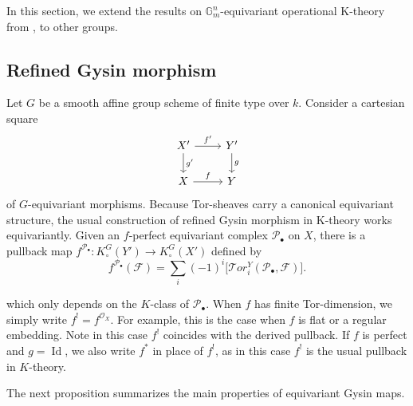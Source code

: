 \documentclass[12pt]{amsart}
\newcommand\Gm{\mathbb{G}_m}
\newcommand{\sF}{\mathscr{F}}
\newcommand{\sO}{\mathscr{O}}
\newcommand{\sP}{\mathscr{P}}
\newcommand{\Id}{\operatorname{Id}}
\newcommand{\Kgroup}{K_{\circ}}
\theoremstyle{definition}
\begin{document}
In this section, we extend the results on $\Gm^n$-equivariant operational K-theory from \cite{AndersonPayne-OperationalKtheory}, to other groups.

\subsection{Refined Gysin morphism}\label{sub:refined-gysin}

Let $G$ be a smooth affine group scheme of finite type over $k$. Consider a cartesian square
\[
\begin{tikzcd}
X' \arrow[r, "f'"] \arrow[d, "g'"] & Y' \arrow[d, "g"] \\
X \arrow[r, "f"] & Y
\end{tikzcd}
\]
of $G$-equivariant morphisms. Because Tor-sheaves carry a canonical equivariant structure, the usual construction of refined Gysin morphism in K-theory works equivariantly. Given an $f$-perfect equivariant complex $\sP_\bullet$ on $X$, there is a pullback map $f^{\sP_\bullet}: \Kgroup^{G}(Y') \to  \Kgroup^{G}(X')$ defined by
\[
f^{\sP_\bullet}(\sF) = \sum_i (-1)^i \big[ \mathcal{T}\!or_i^Y(\sP_\bullet, \sF) \big].
\]

which only depends on the $K$-class of $\sP_\bullet$. When $f$ has finite Tor-dimension, we simply write 
$
f^! = f^{\sO_X}.
$
For example, this is the case when $f$ is flat or a regular embedding. Note in this case $f^!$ coincides with the derived pullback. If $f$ is perfect and $g=\Id$, we also write $f^*$ in place of $f^!$, as in this case $f^{!}$ is the usual pullback in $K$-theory. 

The next proposition summarizes the main properties of equivariant Gysin maps.
\end{document}
